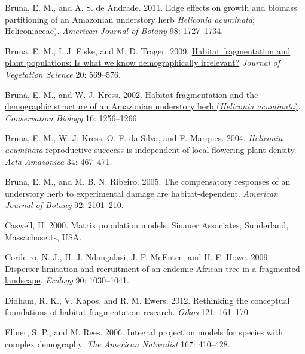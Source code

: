 \documentclass[
  12pt,
  man, donotrepeattitle,floatsintext]{apa6}
\newlength{\cslhangindent}
\newlength{\cslentryspacingunit} %
\newenvironment{CSLReferences}[2] %
 {%
  \setlength{\parindent}{0pt}
  \ifodd #1
  \let\oldpar\par
  \def\par{\hangindent=\cslhangindent\oldpar}
  \fi
  \setlength{\parskip}{#2\cslentryspacingunit}
 }%
 {}
\begin{document}
\begin{CSLReferences}{1}{0}
\leavevmode{}%
Bruna, E. M., and A. S. de Andrade. 2011. Edge effects on growth and biomass partitioning of an {Amazonian} understory herb \emph{{Heliconia} acuminata}; {Heliconiaceae}). \emph{American Journal of Botany} 98: 1727--1734.

\leavevmode{}%
Bruna, E. M., I. J. Fiske, and M. D. Trager. 2009. \href{https://doi.org/10.1111/j.1654-1103.2009.01060.x}{Habitat fragmentation and plant populations: Is what we know demographically irrelevant?} \emph{Journal of Vegetation Science} 20: 569--576.

\leavevmode{}%
Bruna, E. M., and W. J. Kress. 2002. \href{https://doi.org/10.1046/j.1523-1739.2002.99494.x}{Habitat fragmentation and the demographic structure of an {Amazonian} understory herb (\emph{{Heliconia} acuminata})}. \emph{Conservation Biology} 16: 1256--1266.

\leavevmode{}%
Bruna, E. M., W. J. Kress, O. F. da Silva, and F. Marques. 2004. \emph{{Heliconia} acuminata} reproductive succeess is independent of local flowering plant density. \emph{Acta Amazonica} 34: 467--471.

\leavevmode{}%
Bruna, E. M., and M. B. N. Ribeiro. 2005. The compensatory responses of an understory herb to experimental damage are habitat-dependent. \emph{American Journal of Botany} 92: 2101--210.

\leavevmode{}%
Caswell, H. 2000. Matrix population models. Sinauer Associates, Sunderland, Massachusetts, USA.

\leavevmode{}%
Cordeiro, N. J., H. J. Ndangalasi, J. P. McEntee, and H. F. Howe. 2009. \href{https://doi.org/10.1890/07-1208.1}{Disperser limitation and recruitment of an endemic {African} tree in a fragmented landscape}. \emph{Ecology} 90: 1030--1041.

\leavevmode{}%
Didham, R. K., V. Kapos, and R. M. Ewers. 2012. Rethinking the conceptual foundations of habitat fragmentation research. \emph{Oikos} 121: 161--170.

\leavevmode{}%
Ellner, S. P., and M. Rees. 2006. Integral projection models for species with complex demography. \emph{The American Naturalist} 167: 410--428.


\end{CSLReferences}
\end{document}
